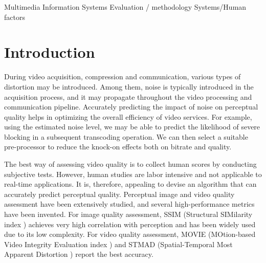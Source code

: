 \documentclass{sig-alternate}
\begin{document}
{Multimedia Information Systems Evaluation / methodology}
 {Systems/Human factors}


\section{Introduction}
During video acquisition, compression and communication, various types of distortion may be introduced. Among them, noise is typically introduced in the acquisition process, and it may propagate throughout the video processing and communication pipeline. Accurately predicting the impact of noise on perceptual quality helps in optimizing the overall efficiency of video services. For example, using the estimated noise level, we may be able to predict the likelihood of severe blocking in a subsequent transcoding operation\cite{AlMer1999}. We can then select a suitable pre-processor to reduce the knock-on effects both on bitrate and quality.

The best way of assessing video quality is to collect human scores by conducting subjective tests. However, human studies are labor intensive and not applicable to real-time applications. It is, therefore, appealing to devise an algorithm that can accurately predict perceptual quality. Perceptual image and video quality assessment have been extensively studied, and several high-performance metrics have been invented. For image quality assessment, SSIM (Structural SIMilarity index \cite{SSIM}) achieves very high correlation with perception and has been widely used due to its low complexity. For video quality assessment, MOVIE (MOtion-based Video Integrity Evaluation index \cite{MOVIE}) and STMAD (Spatial-Temporal Most Apparent Distortion \cite{STMAD}) report the best accuracy. 
\end{document}
